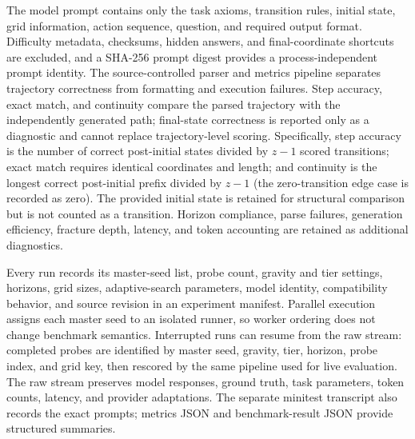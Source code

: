 \documentclass{article}
\begin{document}
The model prompt contains only the task axioms, transition rules, initial
state, grid information, action sequence, question, and required output
format. Difficulty metadata, checksums, hidden answers, and final-coordinate
shortcuts are excluded, and a SHA-256 prompt digest provides a
process-independent prompt identity. The source-controlled parser and metrics
pipeline separates trajectory correctness from formatting and execution
failures. Step accuracy, exact match, and continuity compare the parsed
trajectory with the independently generated path; final-state correctness is
reported only as a diagnostic and cannot replace trajectory-level scoring.
Specifically, step accuracy is the number of correct post-initial states
divided by $z-1$ scored transitions; exact match requires identical
coordinates and length; and continuity is the longest correct post-initial
prefix divided by $z-1$ (the zero-transition edge case is recorded as zero). The provided initial state is retained for structural
comparison but is not counted as a transition.
Horizon compliance, parse failures, generation efficiency, fracture depth,
latency, and token accounting are retained as additional diagnostics.

Every run records its master-seed list, probe count, gravity and tier settings,
horizons, grid sizes, adaptive-search parameters, model identity, compatibility
behavior, and source revision in an experiment manifest. Parallel execution
assigns each master seed to an isolated runner, so worker ordering does not
change benchmark semantics. Interrupted runs can resume from the raw stream:
completed probes are identified by master seed, gravity, tier, horizon, probe
index, and grid key, then rescored by the same pipeline used for live
evaluation. The raw stream preserves model responses, ground truth, task parameters, token
counts, latency, and provider adaptations. The separate minitest transcript
also records the exact prompts; metrics JSON and benchmark-result JSON provide
structured summaries.
\end{document}
